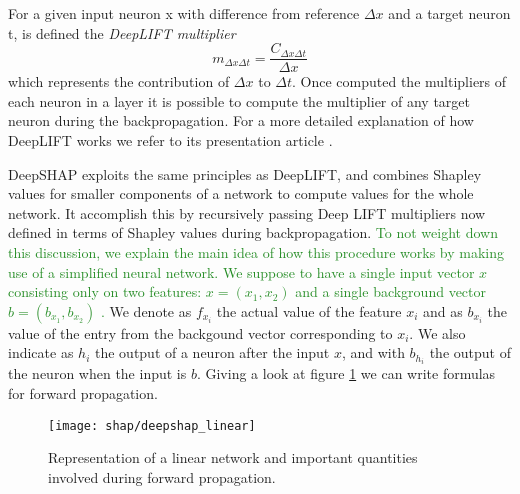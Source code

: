\documentclass[11pt]{report}
\begin{document}
For a given input neuron x with difference from reference $\Delta x$ and a target neuron t, is defined the \emph{DeepLIFT multiplier}
\[
m_{\Delta x \Delta t} = \frac{C_{\Delta x \Delta t}}{\Delta x}
\]
which represents the contribution of $\Delta x$ to $\Delta t$. Once computed the multipliers of each neuron in a layer it is possible to compute the multiplier of any target neuron during the backpropagation.
For a more detailed explanation of how DeepLIFT works we refer to its presentation article \cite{shrikumar-2017}.

DeepSHAP exploits the same principles as DeepLIFT, and combines Shapley values for smaller components of a network to compute values for the whole network. It accomplish this by recursively passing Deep LIFT multipliers now defined in terms of Shapley values during backpropagation.
\textcolor{ForestGreen}{To not weight down this discussion, we explain the main idea of how this procedure works by making use of a simplified neural network.
We suppose to have a single input vector $x$ consisting only on two features: $x = (x_1, x_2)$ and a single background vector $b = (b_{x_1}, b_{x_2})$ .
}
We denote as $f_{x_i}$ the actual value of the feature $x_i$ and as $b_{x_i}$ the value of the entry from the backgound vector corresponding to $x_i$.
We also indicate as $h_i$ the output of a neuron after the input $x$, and with $b_{h_i}$ the output of the neuron when the input is $b$.
Giving a look at figure \ref{fig:deepshap_linear} we can write formulas for forward propagation.

\begin{figure}[h!]
\centering
\texttt{[image: shap/deepshap\_linear]}
\caption{Representation of a linear network and important quantities involved during forward propagation.}
\label{fig:deepshap_linear}
\end{figure}
\end{document}
